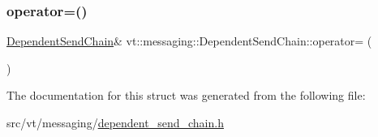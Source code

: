 \subsubsection{\texorpdfstring{operator=()}{operator=()}\hspace{0.1cm}{\footnotesize\ttfamily [2/2]}}
{\footnotesize\ttfamily \hyperlink{classvt_1_1messaging_1_1_dependent_send_chain}{Dependent\+Send\+Chain}\& vt\+::messaging\+::\+Dependent\+Send\+Chain\+::operator= (\begin{DoxyParamCaption}\item[{\hyperlink{classvt_1_1messaging_1_1_dependent_send_chain}{Dependent\+Send\+Chain} \&\&}]{ }\end{DoxyParamCaption})\hspace{0.3cm}{\ttfamily [default]}}



The documentation for this struct was generated from the following file\+:\begin{DoxyCompactItemize}
\item 
src/vt/messaging/\hyperlink{dependent__send__chain_8h}{dependent\+\_\+send\+\_\+chain.\+h}\end{DoxyCompactItemize}
